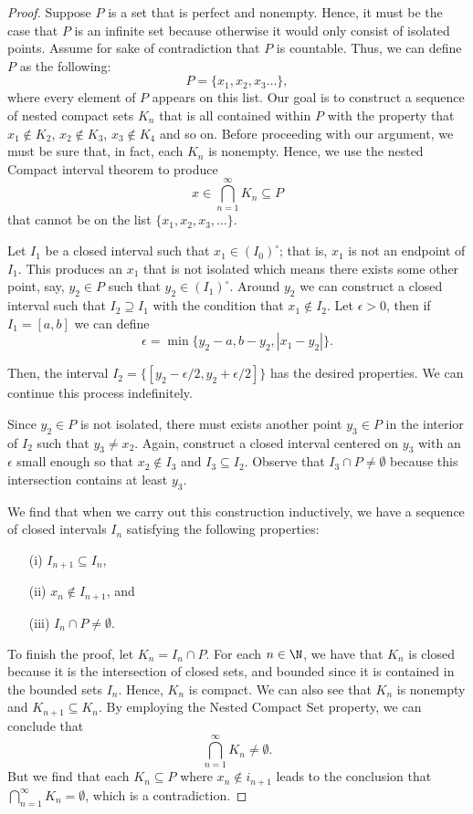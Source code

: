 \begin{proof}
Suppose \( P \) is a set that is perfect and nonempty. Hence, it must be the case that \( P \) is an infinite set because otherwise it would only consist of isolated points. Assume for sake of contradiction that \( P \) is countable. Thus, we can define \( P \) as the following:
\[ P = \{ x_1, x_2, x_3 \dots \},  \]
where every element of \( P \) appears on this list. Our goal is to construct a sequence of nested compact sets \( K_n \) that is all contained within \( P \) with the property that 
\( x_1 \notin K_2 \), \( x_2 \notin K_3 \), \( x_3 \notin K_4 \) and so on. Before proceeding with our argument, we must be sure that, in fact, each \( K_n \) is nonempty. Hence, we use the nested
Compact interval theorem to produce 
\[  x \in \bigcap_{ n=1 }^{ \infty  } K_n \subseteq P \]
that cannot be on the list \( \{ x_1, x_2, x_3, \dots \}  \). 

Let \( I_1  \) be a closed interval such that \( x_1 \in (I_0)^{\circ} \); that is, \( x_1  \) is not an endpoint of \( I_1 \). This produces an \( x_1 \) that is not isolated which means there exists some other point, say, \( y_2 \in P \) such that \( y_2 \in (I_1)^{\circ} \). Around \( y_2 \) we can construct a closed interval such that \( I_2 \supseteq I_1 \) with the condition that \( x_1 \notin I_2 \). Let \( \epsilon  > 0  \), then if \( I_1 = [a,b] \) we can define 
\[ \epsilon = \min \{ y_2 - a, b- y_2 , | x_1 - y_2  |  \}.  \]

Then, the interval \( I_2 = \{ [y_2 - \epsilon / 2, y_2 + \epsilon / 2 ] \}  \) has the desired properties. We can continue this process indefinitely. 

Since \( y_2 \in P \) is not isolated, there must exists another point \( y_3 \in P  \) in the interior of \( I_2  \) such that \( y_3 \neq x_2  \). Again, construct a closed interval centered on \( y_3  \) with an \( \epsilon  \) small enough so that \( x_2 \notin I_3  \) and \( I_3 \subseteq I_2  \). Observe that \( I_3 \cap P \neq \emptyset \) because this intersection contains at least \( y_3  \). 

We find that when we carry out this construction inductively, we have a sequence of closed intervals \( I_n \) satisfying the following properties:
\begin{enumerate}
    \item[(i)] \( I_{n+1} \subseteq I_n  \), 
    \item[(ii)] \(x_n \notin I_{n+1} \), and 
    \item[(iii)] \( I_n \cap P \neq \emptyset \).
\end{enumerate}
To finish the proof, let \( K_n = I_n \cap P \). For each \( n \in \N \), we have that \( K_n  \) is closed because it is the intersection of closed sets, and bounded since it is contained in the bounded sets \( I_n \). Hence, \( K_n  \) is compact. We can also see that \( K_n  \) is nonempty and \( K_{n+1} \subseteq K_n\). By employing the Nested Compact Set property, we can conclude that 
\[ \bigcap_{ n=1  }^{ \infty  } K_n \neq \emptyset. \]
But we find that each \( K_n \subseteq P \) where \( x_n \notin i_{n+1} \) leads to the conclusion that \( \bigcap_{ n=1 }^{ \infty  } K_n = \emptyset  \), which is a contradiction. 


\end{proof}
